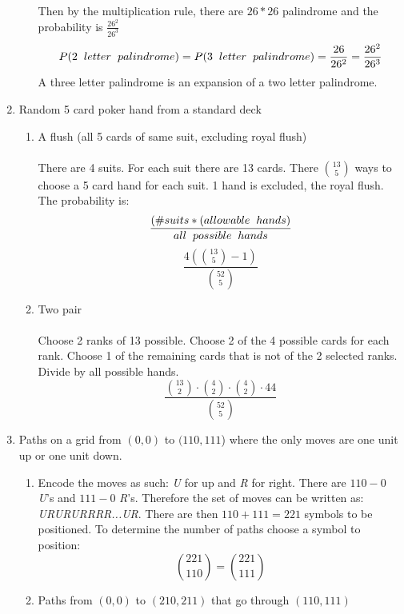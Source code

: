 \documentclass[11pt, oneside]{article}   	%
\begin{document}
\begin{enumerate}
\begin{enumerate}
			Then by the multiplication rule, there are $26 * 26$ palindrome and the probability is $\frac{26^2}{26^3}$
			\[ P(2 \hspace{2mm} letter \hspace{2mm} palindrome) = P(3 \hspace{2mm} letter \hspace{2mm} palindrome) = \frac{26}{26^2} = \frac{26^2}{26^3} \]
			A three letter palindrome is an expansion of a two letter palindrome.
			\end{enumerate}
		\item Random 5 card poker hand from a standard deck
			\begin{enumerate}
				\item A flush (all 5 cards of same suit, excluding royal flush) \\\\
					There are 4 suits. For each suit there are 13 cards. There $\binom{13}{5}$ ways to choose a 5 card hand for each suit. 1 hand is excluded, the royal flush.\\
					The probability is: \[ \frac{(\# suits * ( allowable \hspace{2mm} hands )}{all \hspace{2mm} possible \hspace{2mm} hands} \]
					\[ \frac{4 (\binom{13}{5} - 1)}{\binom{52}{5}} \]
				\item Two pair \\\\
					Choose 2 ranks of 13 possible. Choose 2 of the 4 possible cards for each rank. Choose 1 of the remaining cards that is not of the 2 selected ranks. Divide by all possible hands.
					\[ \frac{\binom{13}{2} \cdot \binom{4}{2} \cdot \binom{4}{2} \cdot 44}{\binom{52}{5}} \]
			\end{enumerate}
		\item Paths on a grid from $(0, 0)$ to $(110, 111$) where the only moves are one unit up or one unit down.
			\begin{enumerate}
				\item Encode the moves as such: \textit{U} for up and \textit{R} for right. There are $110 - 0$ \textit{U}'s and $111 - 0$ \textit{R}'s. Therefore the set of moves can be written as: \textit{URURURRRR...UR}. There are then $110 + 111 = 221$ symbols to be
				positioned. To determine the number of paths choose a symbol to position: \[ \binom{221}{110} = \binom{221}{111} \]
				\item Paths from $(0, 0)$ to $(210, 211)$ that go through $(110, 111)$ \\\\

\end{enumerate}
\end{enumerate}
\end{document}
